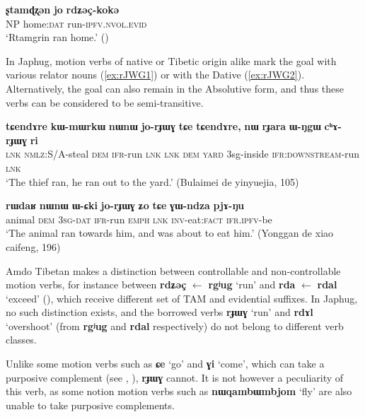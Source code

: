 \documentclass[oneside,a4paper,11pt]{article}
\newcommand{\ipa}[1]{{\phon\textbf{\mbox{#1}}}} %
\begin{document}
\begin{exe}
\ex \label{ex:rgyug}
\gll
\ipa{ʂtamɖʐən} 	\ipa{jo} \ipa{rdʑəç-kokə} 	 \\
NP home:\textsc{dat} run-\textsc{ipfv.nvol.evid} \\
\glt `Rtamgrin ran home.' (\citealt[80, ex. 125]{haller04themchen})
\end{exe}

In Japhug, motion verbs of native or Tibetic origin alike mark the goal with various relator nouns (\ref{ex:rJWG1}) or with the Dative (\ref{ex:rJWG2}). Alternatively, the goal can also remain in the Absolutive form, and thus these verbs can be considered to be semi-transitive. 

\begin{exe}
\ex \label{ex:rJWG1}
\gll
\ipa{tɕendɤre}  	\ipa{kɯ-mɯrkɯ}  	\ipa{nɯnɯ}  	\ipa{jo-rɟɯɣ}  	\ipa{tɕe}  	\ipa{tɕendɤre,}  	\ipa{nɯ}  	\ipa{rɟara}  	\ipa{ɯ-ŋgɯ}  	\ipa{cʰɤ-rɟɯɣ}  	\ipa{ri}  \\
\textsc{lnk} \textsc{nmlz}:S/A-steal \textsc{dem} \textsc{ifr}-run \textsc{lnk} \textsc{lnk} \textsc{dem} \textsc{yard} 3sg-inside \textsc{ifr:downstream}-run \textsc{lnk} \\
\glt `The thief ran, he ran out to the yard.' (Bulaimei de yinyuejia, 105)
\end{exe}

\begin{exe}
\ex \label{ex:rJWG2}
\gll
\ipa{rɯdaʁ}  	\ipa{nɯnɯ}  	\ipa{ɯ-ɕki}  	\ipa{jo-rɟɯɣ}  	\ipa{ʑo}  	\ipa{tɕe}  	\ipa{ɣɯ-ndza}  	\ipa{pjɤ-ŋu}  \\
animal \textsc{dem} \textsc{3sg-dat} \textsc{ifr}-run \textsc{emph} \textsc{lnk} \textsc{inv}-eat:\textsc{fact} \textsc{ifr.ipfv}-be \\
\glt `The animal ran towards him, and was about to eat him.' (Yonggan de xiao caifeng, 196)
\end{exe}


Amdo Tibetan makes a distinction between controllable and non-controllable motion verbs, for instance between \ipa{rdʑəç} $\leftarrow$ \ipa{rgʲug} `run' and \ipa{rda} $\leftarrow$ \ipa{rdal} `exceed' (\citealt[123, ex. 543]{haller04themchen}), which receive different set of TAM and evidential suffixes. In Japhug, no such distinction exists, and  the borrowed verbs \ipa{rɟɯɣ} `run' and \ipa{rdɤl} `overshoot' (from \ipa{rgʲug} and \ipa{rdal} respectively) do not belong to different verb classes.


Unlike some motion verbs such as \ipa{ɕe} `go' and \ipa{ɣi} `come', which can take a purposive complement (see \citealt{sun12complementation}, \citealt{jacques13harmonization}), \ipa{rɟɯɣ} cannot. It is not however a peculiarity of this verb, as some notion motion verbs such as \ipa{nɯqambɯmbjom} `fly' are also unable to take purposive complements.
\end{document}
